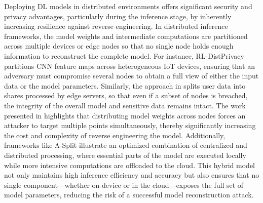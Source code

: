 \documentclass[conference]{IEEEtran}
\begin{document}
Deploying DL models in distributed environments offers significant security and privacy advantages, particularly during the inference stage, by inherently increasing resilience against reverse engineering. In distributed inference frameworks, the model weights and intermediate computations are partitioned across multiple devices or edge nodes so that no single node holds enough information to reconstruct the complete model. For instance, RL-DistPrivacy \cite{baccour2022rl} partitions CNN feature maps across heterogeneous IoT devices, ensuring that an adversary must compromise several nodes to obtain a full view of either the input data or the model parameters. Similarly, the approach in \cite{schlegel2022privacy} splits user data into shares processed by edge servers, so that even if a subset of nodes is breached, the integrity of the overall model and sensitive data remains intact. The work presented in \cite{mann2023towards} highlights that distributing model weights across nodes forces an attacker to target multiple points simultaneously, thereby significantly increasing the cost and complexity of reverse engineering the model. Additionally, frameworks like Λ-Split \cite{ohta2023lambda} illustrate an optimized combination of centralized and distributed processing, where essential parts of the model are executed locally while more intensive computations are offloaded to the cloud. This hybrid model not only maintains high inference efficiency and accuracy but also ensures that no single component—whether on-device or in the cloud—exposes the full set of model parameters, reducing the risk of a successful model reconstruction attack.
\end{document}
